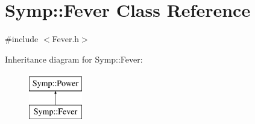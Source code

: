 \hypertarget{class_symp_1_1_fever}{\section{Symp\-:\-:Fever Class Reference}
\label{class_symp_1_1_fever}
}


{\ttfamily \#include $<$Fever.\-h$>$}

Inheritance diagram for Symp\-:\-:Fever\-:\begin{figure}[H]
\begin{center}
\leavevmode
\includegraphics[height=2.000000cm]{class_symp_1_1_fever}
\end{center}
\end{figure}
